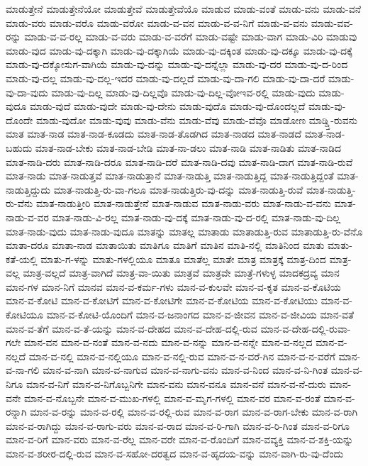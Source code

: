 {ಮಾಡುತ್ತೇನೆ
ಮಾಡುತ್ತೇನೆಯೋ
ಮಾಡುತ್ತೇವೆ
ಮಾಡುತ್ತೇವೆಯೊ
ಮಾಡುವ
ಮಾಡು-ವಂತೆ
ಮಾಡು-ವನು
ಮಾಡು-ವನೆ
ಮಾಡು-ವರು
ಮಾಡು-ವರೊ
ಮಾಡು-ವರೋ
ಮಾಡು-ವ-ವನ
ಮಾಡು-ವ-ವ-ನಿಗೆ
ಮಾಡು-ವ-ವನು
ಮಾಡು-ವವ-ರನ್ನು
ಮಾಡು-ವ-ವ-ರಲ್ಲ
ಮಾಡು-ವ-ವರು
ಮಾಡು-ವ-ವರೆಗೆ
ಮಾಡು-ವಷ್ಟೇ
ಮಾಡು-ವಾಗ
ಮಾಡು-ವಿರಿ
ಮಾಡುವು
ಮಾಡು-ವುದ
ಮಾಡು-ವು-ದಕ್ಕಾಗಿ
ಮಾಡು-ವು-ದಕ್ಕಾಗಿಯೆ
ಮಾಡು-ವು-ದಕ್ಕಿಂತ
ಮಾಡು-ವು-ದಕ್ಕೂ
ಮಾಡು-ವು-ದಕ್ಕೆ
ಮಾಡು-ವು-ದಕ್ಕೋಸುಗ-ವಾಗಿಯೆ
ಮಾಡು-ವು-ದನ್ನು
ಮಾಡು-ವು-ದನ್ನೆಲ್ಲಾ
ಮಾಡು-ವು-ದರ
ಮಾಡು-ವು-ದ-ರಿಂದ
ಮಾಡು-ವು-ದಲ್ಲ
ಮಾಡು-ವು-ದಲ್ಲ-ಇದರ
ಮಾಡು-ವು-ದಲ್ಲದೆ
ಮಾಡು-ವು-ದಾ-ಗಲಿ
ಮಾಡು-ವು-ದಾ-ದರೆ
ಮಾಡು-ವು-ದಾ-ವುದು
ಮಾಡು-ವು-ದಿಲ್ಲ
ಮಾಡು-ವು-ದಿಲ್ಲವೊ
ಮಾಡು-ವು-ದಿಲ್ಲ-ವೋಇವ-ರಲ್ಲಿ
ಮಾಡು-ವುದು
ಮಾಡು-ವುದೂ
ಮಾಡು-ವುದೆ
ಮಾಡು-ವುದೇ
ಮಾಡು-ವು-ದೇನು
ಮಾಡು-ವುದೊ
ಮಾಡು-ವು-ದೊಂದಲ್ಲದೆ
ಮಾಡು-ವು-ದೊಂದೇ
ಮಾಡು-ವುದೋ
ಮಾಡು-ವುವು
ಮಾಡು-ವೆನು
ಮಾಡು-ವೆವು
ಮಾಡು-ವೆವೊ
ಮಾಡೋಣ
ಮಾಡ್ಡ್ತಿ-ರುವನು
ಮಾತ
ಮಾತ-ನಾಡ
ಮಾತ-ನಾಡ-ಕೂಡದು
ಮಾತ-ನಾಡ-ತೊಡಗಿದ
ಮಾತ-ನಾಡದ
ಮಾತ-ನಾಡದೆ
ಮಾತ-ನಾಡ-ಬಹುದು
ಮಾತ-ನಾಡ-ಬೇಕು
ಮಾತ-ನಾಡ-ಬೇಡಿ
ಮಾತ-ನಾ-ಡಲು
ಮಾತ-ನಾಡಿ
ಮಾತ-ನಾಡಿತು
ಮಾತ-ನಾಡಿದ
ಮಾತ-ನಾಡಿ-ದರು
ಮಾತ-ನಾಡಿ-ದರೂ
ಮಾತ-ನಾಡಿ-ದರೆ
ಮಾತ-ನಾಡಿ-ದವು
ಮಾತ-ನಾಡಿ-ದಾಗ
ಮಾತ-ನಾಡಿ-ರುವೆ
ಮಾತ-ನಾಡು
ಮಾತ-ನಾಡುತ್ತವೆ
ಮಾತ-ನಾಡುತ್ತಾನೆ
ಮಾತ-ನಾಡುತ್ತಿ
ಮಾತ-ನಾಡುತ್ತಿದ್ದ
ಮಾತ-ನಾಡುತ್ತಿದ್ದಂತೆ
ಮಾತ-ನಾಡುತ್ತಿದ್ದುದು
ಮಾತ-ನಾಡುತ್ತಿ-ರು-ವಾ-ಗಲೂ
ಮಾತ-ನಾಡುತ್ತಿರು-ವು-ದನ್ನು
ಮಾತ-ನಾಡುತ್ತಿ-ರುವೆ
ಮಾತ-ನಾಡುತ್ತಿ-ರು-ವೆನು
ಮಾತ-ನಾಡುತ್ತೀರಿ
ಮಾತ-ನಾಡುತ್ತೇನೆ
ಮಾತ-ನಾಡುವ
ಮಾತ-ನಾಡು-ವರು
ಮಾತ-ನಾಡು-ವ-ವನು
ಮಾತ-ನಾಡು-ವ-ವರ
ಮಾತ-ನಾಡು-ವಿ-ರಲ್ಲ
ಮಾತ-ನಾಡು-ವು-ದಕ್ಕೆ
ಮಾತ-ನಾಡು-ವು-ದ-ರಲ್ಲಿ
ಮಾತ-ನಾಡು-ವು-ದಿಲ್ಲ
ಮಾತ-ನಾಡು-ವುದು
ಮಾತ-ನಾಡು-ವುದೂ
ಮಾತನ್ನು
ಮಾತಲ್ಲ
ಮಾತಾಡು
ಮಾತಾಡುತ್ತಿ-ರುವ
ಮಾತಾಡುತ್ತಿ-ರು-ವೆನೊ
ಮಾತಾ-ದರೂ
ಮಾತಾ-ನಾಡ
ಮಾತಾಯಿತು
ಮಾತಿಗೂ
ಮಾತಿಗೆ
ಮಾತಿನ
ಮಾತಿ-ನಲ್ಲಿ
ಮಾತಿನಿಂದ
ಮಾತು
ಮಾತು-ಕತೆ-ಯಲ್ಲಿ
ಮಾತು-ಗ-ಳನ್ನು
ಮಾತು-ಗಳಲ್ಲಿಯೂ
ಮಾತೂ
ಮಾತೆಲ್ಲ
ಮಾತೇ
ಮಾತ್ರ
ಮಾತ್ರಕ್ಕೆ
ಮಾತ್ರ-ದಿಂದ
ಮಾತ್ರ-ವಲ್ಲ
ಮಾತ್ರ-ವಲ್ಲದೆ
ಮಾತ್ರ-ವಾಗಿದೆ
ಮಾತ್ರ-ವಾ-ಯಿತು
ಮಾತ್ರವೆ
ಮಾತ್ರವೇ
ಮಾತ್ರೆ-ಗಳುಳ್ಳ
ಮಾದಕದ್ರವ್ಯ
ಮಾನ
ಮಾನ-ಗಳ
ಮಾನ-ನಿಗೆ
ಮಾನವ
ಮಾನ-ವ-ಕರ್ಮ-ಗಳು
ಮಾನ-ವ-ಕುಲವೇ
ಮಾನ-ವ-ಕೃತ
ಮಾನ-ವ-ಕೊಟಿಯ
ಮಾನ-ವ-ಕೋಟಿ
ಮಾನ-ವ-ಕೋಟಿಗೆ
ಮಾನ-ವ-ಕೋಟಿಗೇ
ಮಾನ-ವ-ಕೋಟಿಯ
ಮಾನ-ವ-ಕೋಟಿಯು
ಮಾನ-ವ-ಕೋಟಿಯೂ
ಮಾನ-ವ-ಕೋಟಿ-ಯೊಂದಿಗೆ
ಮಾನ-ವ-ಜನಾಂಗದ
ಮಾನ-ವ-ಜೀವನ
ಮಾನ-ವ-ಜೀವಿಯ
ಮಾನ-ವತೆ
ಮಾನ-ವ-ತೆಗೆ
ಮಾನ-ವ-ತೆ-ಯನ್ನು
ಮಾನ-ವ-ದೇಹದ
ಮಾನ-ವ-ದೇಹ-ದಲ್ಲಿ-ರುವ
ಮಾನ-ವ-ದೇಹ-ದಲ್ಲಿ-ರುವಾ-ಗಲೇ
ಮಾನ-ವನ
ಮಾನ-ವ-ನಂತೆ
ಮಾನ-ವ-ನದು
ಮಾನ-ವ-ನನ್ನು
ಮಾನ-ವ-ನನ್ನೇ
ಮಾನ-ವ-ನಲ್ಲದ
ಮಾನ-ವ-ನಲ್ಲದೆ
ಮಾನ-ವ-ನಲ್ಲಿ
ಮಾನ-ವ-ನಲ್ಲಿಯೂ
ಮಾನ-ವ-ನಲ್ಲಿ-ರುವ
ಮಾನ-ವ-ನ-ವರೆ-ಗಿನ
ಮಾನ-ವ-ನ-ವರೆಗೆ
ಮಾನ-ವ-ನಾ-ಗಲಿ
ಮಾನ-ವ-ನಾಗಿ
ಮಾನ-ವ-ನಾಗುವ
ಮಾನ-ವ-ನಾಗು-ವನು
ಮಾನ-ವ-ನಿಂದ
ಮಾನ-ವ-ನಿ-ಗಿಂತ
ಮಾನ-ವ-ನಿಗೂ
ಮಾನ-ವ-ನಿಗೆ
ಮಾನ-ವ-ನಿಗೊಬ್ಬನಿಗೇ
ಮಾನ-ವನು
ಮಾನ-ವನೂ
ಮಾನ-ವನೆ
ಮಾನ-ವ-ನೆ-ದುರು
ಮಾನ-ವನೇ
ಮಾನ-ವ-ನೊಬ್ಬನೇ
ಮಾನ-ವ-ಮುಖ-ಗಳಲ್ಲಿ
ಮಾನ-ವ-ಮೃಗ-ಗಳಲ್ಲಿ
ಮಾನ-ವರ
ಮಾನ-ವ-ರಂತೆ
ಮಾನ-ವ-ರನ್ನಾಗಿ
ಮಾನ-ವ-ರನ್ನು
ಮಾನ-ವ-ರಲ್ಲಿ
ಮಾನ-ವ-ರಲ್ಲಿ-ರುವ
ಮಾನ-ವ-ರಾಗ
ಮಾನ-ವ-ರಾಗ-ಬೇಕು
ಮಾನ-ವ-ರಾಗಿ
ಮಾನ-ವ-ರಾಗಿದ್ದು
ಮಾನ-ವ-ರಾಗು-ವರು
ಮಾನ-ವ-ರಾದ
ಮಾನ-ವ-ರಿ-ಗಾಗಿ
ಮಾನ-ವ-ರಿ-ಗಿಂತ
ಮಾನ-ವ-ರಿಗೂ
ಮಾನ-ವ-ರಿಗೆ
ಮಾನ-ವರು
ಮಾನ-ವ-ರೆಲ್ಲ
ಮಾನ-ವರೇ
ಮಾನ-ವ-ರೊಂದಿಗೆ
ಮಾನ-ವವ್ಯಕ್ತಿ
ಮಾನ-ವ-ಶಕ್ತಿ-ಯನ್ನು
ಮಾನ-ವ-ಶರೀರ-ದಲ್ಲಿ-ರುವ
ಮಾನ-ವ-ಸಹೋ-ದರತ್ವದ
ಮಾನ-ವ-ಹೃದಯ-ವನ್ನು
ಮಾನ-ವಾಗಿ-ರು-ವು-ದೆಂದು
}
